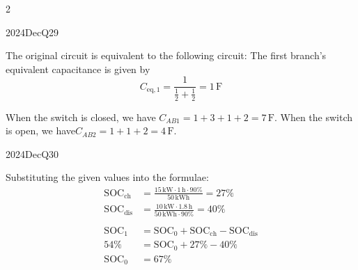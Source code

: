 \begin{multicols}{2}
\begin{qsolution}{2024}{Dec}{Q29}{\tgEE \tgEECapacitors \tgEECircuitAnalysis}

    The original circuit is equivalent to the following circuit:
    The first branch's equivalent capacitance is given by
    \[C_{\mathrm{eq},1}=\frac{1}{\frac{1}{2}+\frac{1}{2}}=1\,\mathrm{F}\]
    
    When the switch is closed, we have $C_{AB1}=1+3+1+2=7\,\mathrm{F}.$
    When the switch is open, we have$C_{AB2}=1+1+2=4\,\mathrm{F}.$
\end{qsolution}

\begin{qsolution}{2024}{Dec}{Q30}{\tgEE \tgEEBatterySOC}

    Substituting the given values into the formulae:
    \begin{align*}
        \mathrm{SOC}_{\mathrm{ch}} &= \frac{15\,\mathrm{kW}\cdot 1\,\mathrm{h}\cdot 90\%}{50\,\mathrm{kWh}} = 27\%\\
        \mathrm{SOC}_\mathrm{dis} &= \frac{10\,\mathrm{kW}\cdot 1.8\,\mathrm{h}}{50\,\mathrm{kWh}\cdot 90\%} = 40\%\\
        &\phantom{.}\\ %
        \mathrm{SOC}_1 &= \mathrm{SOC}_0 + \mathrm{SOC}_{\mathrm{ch}} - \mathrm{SOC}_{\mathrm{dis}}\\
        54\% &= \mathrm{SOC}_0 + 27\% - 40\% \\
        \mathrm{SOC}_0 &= 67\%
    \end{align*}
\end{qsolution}

\end{multicols}

\pagebreak

